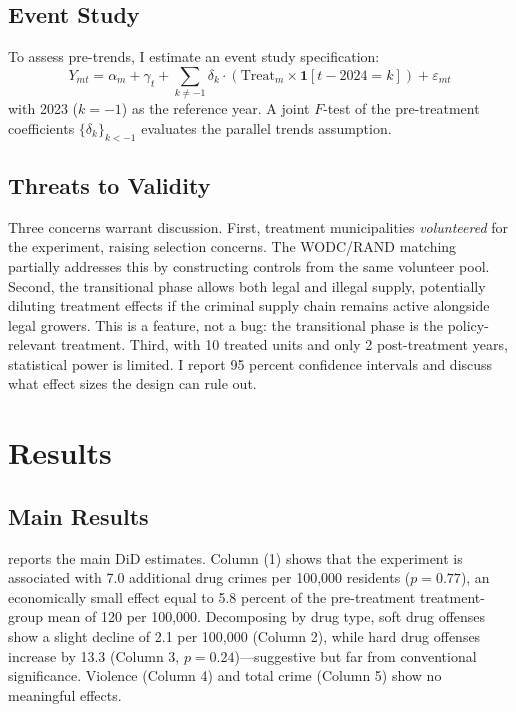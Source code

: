 \documentclass[12pt]{article}
\begin{document}
\subsection{Event Study}

To assess pre-trends, I estimate an event study specification:
\begin{equation}
Y_{mt} = \alpha_m + \gamma_t + \sum_{k \neq -1} \delta_k \cdot (\text{Treat}_m \times \mathbf{1}[t - 2024 = k]) + \varepsilon_{mt}
\label{eq:es}
\end{equation}
with 2023 ($k = -1$) as the reference year. A joint $F$-test of the pre-treatment coefficients $\{\delta_k\}_{k < -1}$ evaluates the parallel trends assumption.

\subsection{Threats to Validity}

Three concerns warrant discussion. First, treatment municipalities \textit{volunteered} for the experiment, raising selection concerns. The WODC/RAND matching partially addresses this by constructing controls from the same volunteer pool. Second, the transitional phase allows both legal and illegal supply, potentially diluting treatment effects if the criminal supply chain remains active alongside legal growers. This is a feature, not a bug: the transitional phase is the policy-relevant treatment. Third, with 10 treated units and only 2 post-treatment years, statistical power is limited. I report 95 percent confidence intervals and discuss what effect sizes the design can rule out.


\section{Results}

\subsection{Main Results}



 reports the main DiD estimates. Column (1) shows that the experiment is associated with 7.0 additional drug crimes per 100,000 residents ($p = 0.77$), an economically small effect equal to 5.8 percent of the pre-treatment treatment-group mean of 120 per 100,000. Decomposing by drug type, soft drug offenses show a slight decline of 2.1 per 100,000 (Column 2), while hard drug offenses increase by 13.3 (Column 3, $p = 0.24$)---suggestive but far from conventional significance. Violence (Column 4) and total crime (Column 5) show no meaningful effects.
\end{document}
